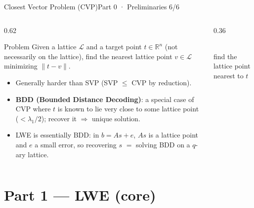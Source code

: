 \documentclass[aspectratio=169, 11pt]{beamer}
\newcommand{\R}{\mathbb{R}}
\begin{document}
\begin{frame}{Closest Vector Problem (CVP)}{Part 0 · Preliminaries 6/6}
  \begin{columns}[T]
    \begin{column}{0.62\textwidth}
      \begin{block}{Problem}
        Given a lattice $\mathcal{L}$ and a target point $t\in\R^n$ (not necessarily on the lattice),
        find the nearest lattice point $v\in\mathcal{L}$ minimizing $\|t-v\|$.
      \end{block}
      \begin{itemize}\small
        \item Generally harder than SVP (SVP $\le$ CVP by reduction).
        \item \textbf{BDD (Bounded Distance Decoding)}: a special case of CVP where $t$ is known to lie
          very close to some lattice point ($<\lambda_1/2$); recover it $\Rightarrow$ unique solution.
        \item \alert{LWE is essentially BDD}: in $b=As+e$, $As$ is a lattice point and $e$ a small error,
          so recovering $s$ $=$ solving BDD on a $q$-ary lattice.
      \end{itemize}
    \end{column}
    \begin{column}{0.36\textwidth}
      \centering
      \\[2pt]{\scriptsize find the lattice point nearest to $t$}
    \end{column}
  \end{columns}
\end{frame}

\section{Part 1 --- LWE (core)}
\end{document}
